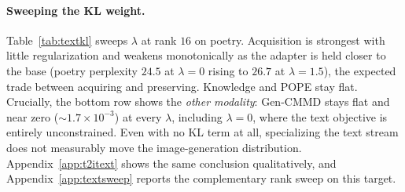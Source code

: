 \documentclass{article}
\begin{document}
\paragraph{Sweeping the KL weight.}
Table~\ref{tab:textkl} sweeps $\lambda$ at rank $16$ on poetry. Acquisition is
strongest with little regularization and weakens monotonically as the adapter is
held closer to the base (poetry perplexity $24.5$ at $\lambda=0$ rising to
$26.7$ at $\lambda=1.5$), the expected trade between acquiring and preserving.
Knowledge and POPE stay flat. Crucially, the bottom row shows the \emph{other
modality}: Gen-CMMD stays flat and near zero ($\sim\!1.7\times10^{-3}$) at every
$\lambda$, including $\lambda=0$, where the text objective is entirely
unconstrained. Even with no KL term at all, specializing the text stream does not
measurably move the image-generation distribution. Appendix~\ref{app:t2itext}
shows the same conclusion qualitatively, and Appendix~\ref{app:textsweep} reports
the complementary rank sweep on this target.
\end{document}
